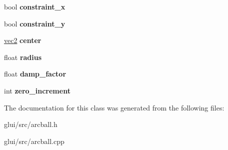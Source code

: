 \begin{DoxyCompactItemize}
\item 
\hypertarget{classArcball_aaeed50eff2338720a5ccc6530e28e941}{bool {\bfseries constraint\-\_\-x}}\label{classArcball_aaeed50eff2338720a5ccc6530e28e941}

\item 
\hypertarget{classArcball_aa46718d1b438010622664c65f7412c2e}{bool {\bfseries constraint\-\_\-y}}\label{classArcball_aa46718d1b438010622664c65f7412c2e}

\item 
\hypertarget{classArcball_ac196c376b8f265704033938b0d6a7b6d}{\hyperlink{classvec2}{vec2} {\bfseries center}}\label{classArcball_ac196c376b8f265704033938b0d6a7b6d}

\item 
\hypertarget{classArcball_aed2e9c177c4f650e9aef6f3050972f6a}{float {\bfseries radius}}\label{classArcball_aed2e9c177c4f650e9aef6f3050972f6a}

\item 
\hypertarget{classArcball_a0b3b8f1e4f37e60ad3138ea41e0d0f13}{float {\bfseries damp\-\_\-factor}}\label{classArcball_a0b3b8f1e4f37e60ad3138ea41e0d0f13}

\item 
\hypertarget{classArcball_a5cb4b94f265115a4a60027071a123b8f}{int {\bfseries zero\-\_\-increment}}\label{classArcball_a5cb4b94f265115a4a60027071a123b8f}

\end{DoxyCompactItemize}


The documentation for this class was generated from the following files\-:\begin{DoxyCompactItemize}
\item 
glui/src/arcball.\-h\item 
glui/src/arcball.\-cpp\end{DoxyCompactItemize}
